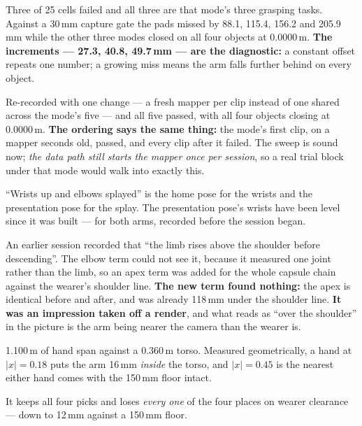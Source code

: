 {Three of 25 cells failed and all three are that mode's three grasping tasks.
Against a 30\,mm capture gate the pads missed by 88.1, 115.4, 156.2 and
205.9\,mm while the other three modes closed on all four objects at 0.0000\,m.
\textbf{The increments --- 27.3, 40.8, 49.7\,mm --- are the diagnostic:} a
constant offset repeats one number; a growing miss means the arm falls further
behind on every object.}

{Re-recorded with one change --- a fresh mapper per clip instead of one shared
across the mode's five --- and all five passed, with all four objects closing at
0.0000\,m. \textbf{The ordering says the same thing:} the mode's first clip, on
a mapper seconds old, passed, and every clip after it failed. The sweep is
sound now; \emph{the data path still starts the mapper once per session}, so a
real trial block under that mode would walk into exactly this.}

{``Wrists up and elbows splayed'' is the home pose for the wrists and the
presentation pose for the splay. The presentation pose's wrists have been level
since it was built ---  for both arms, recorded before
the session began.}

{An earlier session recorded that ``the limb rises above the shoulder before
descending''. The elbow term could not see it, because it measured one joint
rather than the limb, so an apex term was added for the whole capsule chain
against the wearer's shoulder line. \textbf{The new term found nothing:} the
apex is identical before and after, and was already 118\,mm under the shoulder
line. \textbf{It was an impression taken off a render}, and what reads as ``over
the shoulder'' in the picture is the arm being nearer the camera than the wearer
is.}

{1.100\,m of hand span against a 0.360\,m torso. Measured geometrically, a hand
at $|x| = 0.18$ puts the arm 16\,mm \emph{inside} the torso, and $|x| = 0.45$ is
the nearest either hand comes with the 150\,mm floor intact.}

{It keeps all four picks and loses \emph{every one} of the four places on wearer
clearance --- down to 12\,mm against a 150\,mm floor.}


